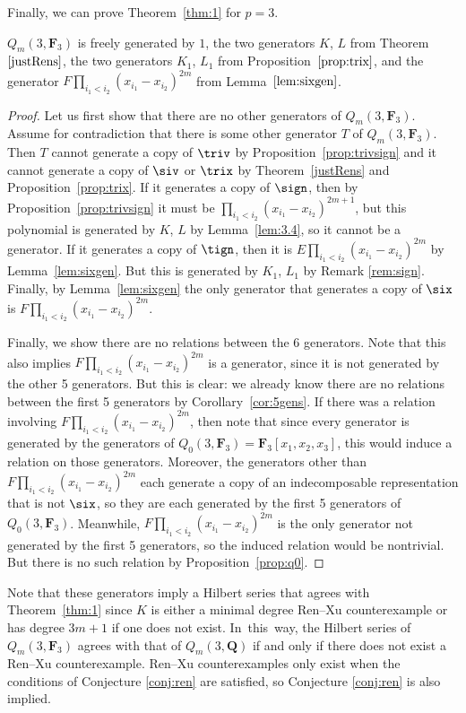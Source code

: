  Finally, we can prove Theorem~\ref{thm:1} for $p=3$.

 \begin{Theorem}
 $Q_m(3,\mathbf{F}_3)$ is freely generated by $1$, the two generators $K$, $L$ from Theorem~$\ref{justRens}$, the two generators $K_1$, $L_1$ from Proposition~$\ref{prop:trix}$, and the generator $F\prod_{i_1<i_2}(x_{i_1}-x_{i_2})^{2m}$ from Lemma~$\ref{lem:sixgen}$.
 \end{Theorem}

 \begin{proof}
 Let us first show that there are no other generators of $Q_m(3,\mathbf{F}_3)$. Assume for contradiction that there is some other generator $T$ of $Q_m(3,\mathbf{F}_3)$. Then $T$ cannot generate a copy of $\triv$ by Proposition~\ref{prop:trivsign} and it cannot generate a copy of $\siv$ or $\trix$ by Theorem~\ref{justRens} and Proposition~\ref{prop:trix}. If it generates a copy of $\sign$, then by Proposition~\ref{prop:trivsign} it must be $\prod_{i_1<i_2}(x_{i_1}-x_{i_2})^{2m+1}$, but this polynomial is generated by $K$, $L$ by Lemma~\ref{lem:3.4}, so it cannot be a generator. If it generates a copy of $\tign$, then it is $E\prod_{i_1<i_2}(x_{i_1}-x_{i_2})^{2m}$ by Lemma~\ref{lem:sixgen}. But this is generated by $K_1$, $L_1$ by Remark \ref{rem:sign}. Finally, by Lemma~\ref{lem:sixgen} the only generator that generates a copy of $\six$ is $F\prod_{i_1<i_2}(x_{i_1}-x_{i_2})^{2m}$.

 Finally, we show there are no relations between the 6 generators. Note that this also implies $F\prod_{i_1<i_2}(x_{i_1}-x_{i_2})^{2m}$ is a generator, since it is not generated by the other 5 generators. But this is clear: we already know there are no relations between the first 5 generators by Corollary~\ref{cor:5gens}. If there was a relation involving $F\prod_{i_1<i_2}(x_{i_1}-x_{i_2})^{2m}$, then note that since every generator is generated by the generators of $Q_0(3,\mathbf{F}_3)=\mathbf{F}_3[x_1,x_2,x_3]$, this would induce a relation on those generators. Moreover, the generators other than $F\prod_{i_1<i_2}(x_{i_1}-x_{i_2})^{2m}$ each generate a copy of an indecomposable representation that is not $\six$, so they are each generated by the first 5 generators of $Q_0(3,\mathbf{F}_3)$. Meanwhile, $F\prod_{i_1<i_2}(x_{i_1}-x_{i_2})^{2m}$ is the only generator not generated by the first 5 generators, so the induced relation would be nontrivial. But there is no such relation by Proposition~\ref{prop:q0}.
 \end{proof}

 Note that these generators imply a Hilbert series that agrees with Theorem~\ref{thm:1} since $K$ is either a minimal degree Ren--Xu counterexample or has degree $3m+1$ if one does not exist. In~this~way, the Hilbert series of $Q_m(3,\mathbf{F}_3)$ agrees with that of $Q_m(3,\mathbf{Q})$ if and only if there does not exist a Ren--Xu counterexample. Ren--Xu counterexamples only exist when the conditions of Conjecture \ref{conj:ren} are satisfied, so Conjecture \ref{conj:ren} is also implied.

